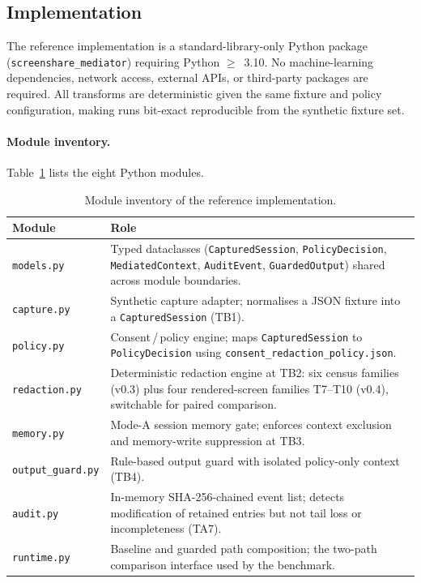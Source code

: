 \documentclass[pdflatex,sn-mathphys-num]{sn-jnl}
\begin{document}
\subsection{Implementation}\label{sec:impl}

The reference implementation is a standard-library-only Python package
(\texttt{screenshare\_mediator}) requiring Python $\geq$~3.10. No
machine-learning dependencies, network access, external APIs, or third-party
packages are required. All transforms are deterministic given the same fixture
and policy configuration, making runs bit-exact reproducible from the synthetic
fixture set.

\paragraph{Module inventory.}
Table~\ref{tab:modules} lists the eight Python modules.

\begin{table}[ht]
\caption{Module inventory of the reference implementation.}
\label{tab:modules}
\begin{tabular}{@{}lp{8.8cm}@{}}
\toprule
Module & Role \\
\midrule
\texttt{models.py}
  & Typed dataclasses (\texttt{CapturedSession}, \texttt{PolicyDecision},
    \texttt{MediatedContext}, \texttt{AuditEvent}, \texttt{GuardedOutput})
    shared across module boundaries. \\[3pt]
\texttt{capture.py}
  & Synthetic capture adapter; normalises a JSON fixture into a
    \texttt{CapturedSession} (TB1). \\[3pt]
\texttt{policy.py}
  & Consent\,/\,policy engine; maps \texttt{CapturedSession} to
    \texttt{PolicyDecision} using
    \texttt{consent\_redaction\_policy.json}. \\[3pt]
\texttt{redaction.py}
  & Deterministic redaction engine at TB2: six census families (v0.3) plus
    four rendered-screen families T7--T10 (v0.4), switchable for paired
    comparison. \\[3pt]
\texttt{memory.py}
  & Mode-A session memory gate; enforces context exclusion and
    memory-write suppression at TB3. \\[3pt]
\texttt{output\_guard.py}
  & Rule-based output guard with isolated policy-only context (TB4). \\[3pt]
\texttt{audit.py}
  & In-memory SHA-256-chained event list; detects modification of retained
    entries but not tail loss or incompleteness (TA7). \\[3pt]
\texttt{runtime.py}
  & Baseline and guarded path composition; the two-path comparison
    interface used by the benchmark. \\
\bottomrule
\end{tabular}
\end{table}
\end{document}
